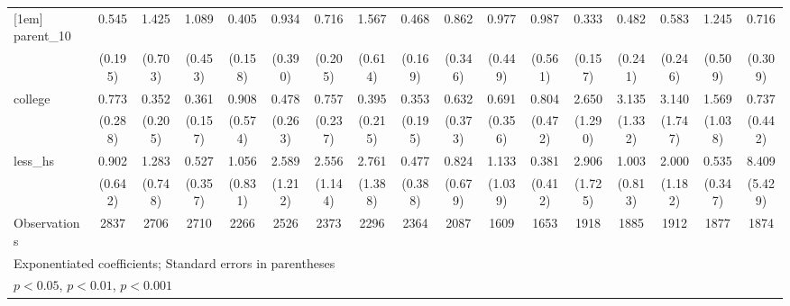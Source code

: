 {\begin{tabular}{l*{16}{c}}
[1em]
parent\_10           &       0.545         &       1.425         &       1.089         &       0.405\sym{*}  &       0.934         &       0.716         &       1.567         &       0.468\sym{*}  &       0.862         &       0.977         &       0.987         &       0.333\sym{*}  &       0.482         &       0.583         &       1.245         &       0.716         \\
                    &     (0.195)         &     (0.703)         &     (0.453)         &     (0.158)         &     (0.390)         &     (0.205)         &     (0.614)         &     (0.169)         &     (0.346)         &     (0.449)         &     (0.561)         &     (0.157)         &     (0.241)         &     (0.246)         &     (0.509)         &     (0.309)         \\
[1em]
college             &       0.773         &       0.352         &       0.361\sym{*}  &       0.908         &       0.478         &       0.757         &       0.395         &       0.353         &       0.632         &       0.691         &       0.804         &       2.650\sym{*}  &       3.135\sym{**} &       3.140\sym{*}  &       1.569         &       0.737         \\
                    &     (0.288)         &     (0.205)         &     (0.157)         &     (0.574)         &     (0.263)         &     (0.237)         &     (0.215)         &     (0.195)         &     (0.373)         &     (0.356)         &     (0.472)         &     (1.290)         &     (1.332)         &     (1.747)         &     (1.038)         &     (0.442)         \\
[1em]
less\_hs             &       0.902         &       1.283         &       0.527         &       1.056         &       2.589\sym{*}  &       2.556\sym{*}  &       2.761\sym{*}  &       0.477         &       0.824         &       1.133         &       0.381         &       2.906         &       1.003         &       2.000         &       0.535         &       8.409\sym{***}\\
                    &     (0.642)         &     (0.748)         &     (0.357)         &     (0.831)         &     (1.212)         &     (1.144)         &     (1.388)         &     (0.388)         &     (0.679)         &     (1.039)         &     (0.412)         &     (1.725)         &     (0.813)         &     (1.182)         &     (0.347)         &     (5.429)         \\
\hline
Observations        &        2837         &        2706         &        2710         &        2266         &        2526         &        2373         &        2296         &        2364         &        2087         &        1609         &        1653         &        1918         &        1885         &        1912         &        1877         &        1874         \\
\hline\hline
\multicolumn{17}{l}{\footnotesize Exponentiated coefficients; Standard errors in parentheses}\\
\multicolumn{17}{l}{\footnotesize \sym{*} \(p<0.05\), \sym{**} \(p<0.01\), \sym{***} \(p<0.001\)}\\
\end{tabular}
}
